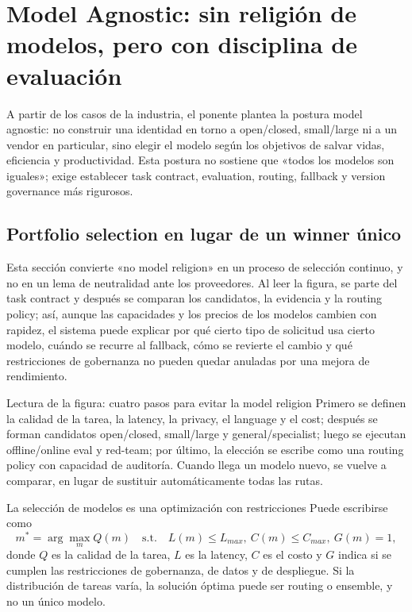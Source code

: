 \section{Model Agnostic: sin religión de modelos, pero con disciplina de evaluación}

A partir de los casos de la industria, el ponente plantea la postura model agnostic: no construir una identidad en torno a open/closed, small/large ni a un vendor en particular, sino elegir el modelo según los objetivos de salvar vidas, eficiencia y productividad. Esta postura no sostiene que «todos los modelos son iguales»; exige establecer task contract, evaluation, routing, fallback y version governance más rigurosos.

\subsection{Portfolio selection en lugar de un winner único}

Esta sección convierte «no model religion» en un proceso de selección continuo, y no en un lema de neutralidad ante los proveedores. Al leer la figura, se parte del task contract y después se comparan los candidatos, la evidencia y la routing policy; así, aunque las capacidades y los precios de los modelos cambien con rapidez, el sistema puede explicar por qué cierto tipo de solicitud usa cierto modelo, cuándo se recurre al fallback, cómo se revierte el cambio y qué restricciones de gobernanza no pueden quedar anuladas por una mejora de rendimiento.


\begin{knowledgebox}{Lectura de la figura: cuatro pasos para evitar la model religion}
Primero se definen la calidad de la tarea, la latency, la privacy, el language y el cost; después se forman candidatos open/closed, small/large y general/specialist; luego se ejecutan offline/online eval y red-team; por último, la elección se escribe como una routing policy con capacidad de auditoría. Cuando llega un modelo nuevo, se vuelve a comparar, en lugar de sustituir automáticamente todas las rutas.
\end{knowledgebox}

\begin{importantbox}{La selección de modelos es una optimización con restricciones}
Puede escribirse como
\[
m^*=\arg\max_m Q(m)\quad
\text{s.t.}\quad L(m)\leq L_{max},\ C(m)\leq C_{max},\ G(m)=1,
\]
donde $Q$ es la calidad de la tarea, $L$ es la latency, $C$ es el costo y $G$ indica si se cumplen las restricciones de gobernanza, de datos y de despliegue. Si la distribución de tareas varía, la solución óptima puede ser routing o ensemble, y no un único modelo.
\end{importantbox}

